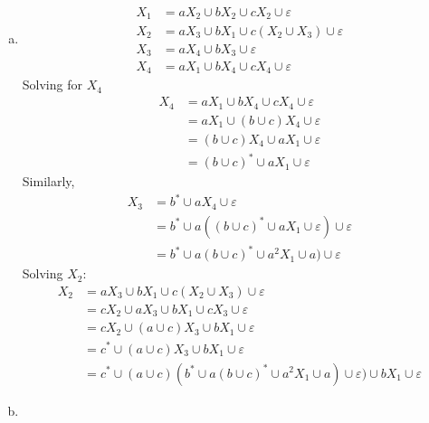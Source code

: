 \begin{solution}
    \begin{enumerate}[(a)]
        \item 
        
        \begin{align*}
            X_1 &= aX_2\cup bX_2\cup cX_2\cup\varepsilon\\
            X_2 &= aX_3\cup bX_1 \cup c(X_2\cup X_3)\cup\varepsilon\\
            X_3 &= aX_4\cup bX_3\cup\varepsilon\\
            X_4 &= aX_1\cup bX_4\cup cX_4\cup\varepsilon  
        \end{align*}
        Solving for $X_4$ 
        \begin{align*}
            X_4 &= aX_1\cup bX_4\cup cX_4\cup\varepsilon\\
                &= aX_1\cup (b\cup c)X_4\cup\varepsilon\\
                &= (b\cup c)X_4\cup aX_1\cup\varepsilon\\
                &= (b\cup c)^*\cup aX_1\cup\varepsilon
        \end{align*}
    Similarly, 
        \begin{align*}
            X_3 &= b^*\cup aX_4\cup\varepsilon\\
                &=b^*\cup a((b\cup c)^*\cup aX_1\cup\varepsilon)\cup\varepsilon\\
                &=b^*\cup a(b\cup c)^*\cup a^2X_1\cup a)\cup\varepsilon    
        \end{align*}
    Solving $X_2$:
    \begin{align*}
        X_2 &= aX_3\cup bX_1 \cup c(X_2\cup X_3)\cup\varepsilon\\
            &= cX_2\cup aX_3\cup bX_1 \cup cX_3\cup\varepsilon\\
            &= cX_2\cup (a\cup c)X_3\cup bX_1\cup\varepsilon\\
            &= c^*\cup (a\cup c)X_3\cup bX_1\cup\varepsilon\\
            &= c^*\cup (a\cup c)(b^*\cup a(b\cup c)^*\cup a^2X_1\cup a)\cup\varepsilon)\cup bX_1\cup\varepsilon
    \end{align*}
        \item 
\end{enumerate}
\end{solution}
